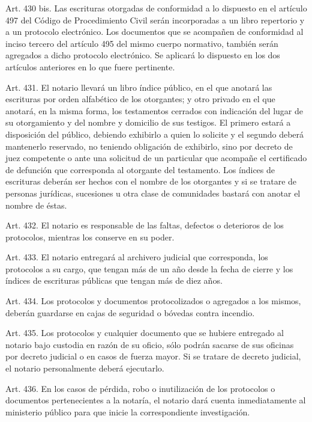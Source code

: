     Art. 430 bis. Las escrituras otorgadas de conformidad a lo dispuesto en el artículo 497 del Código de Procedimiento Civil serán incorporadas a un libro repertorio y a un protocolo electrónico. Los documentos que se acompañen de conformidad al inciso tercero del artículo 495 del mismo cuerpo normativo, también serán agregados a dicho protocolo electrónico. Se aplicará lo dispuesto en los dos artículos anteriores en lo que fuere pertinente.

    Art. 431. El notario llevará un libro índice público, en el que anotará las escrituras por orden alfabético de los otorgantes; y otro privado en el que anotará, en la misma forma, los testamentos cerrados con indicación del lugar de su otorgamiento y del nombre y domicilio de sus testigos.
    El primero estará a disposición del público, debiendo exhibirlo a quien lo solicite y el segundo deberá mantenerlo reservado, no teniendo obligación de exhibirlo, sino por decreto de juez competente o ante una solicitud de un particular que acompañe el certificado de defunción que corresponda al otorgante del testamento.
    Los índices de escrituras deberán ser hechos con el nombre de los otorgantes y si se tratare de personas jurídicas, sucesiones u otra clase de comunidades bastará con anotar el nombre de éstas.



    Art. 432. El notario es responsable de las faltas, defectos o deterioros de los protocolos, mientras los conserve en su poder.



    Art. 433. El notario entregará al archivero judicial que corresponda, los protocolos a su cargo, que tengan más de un año desde la fecha de cierre y los índices de escrituras públicas que tengan más de diez años.



    Art. 434. Los protocolos y documentos protocolizados o agregados a los mismos, deberán guardarse en cajas de seguridad o bóvedas contra incendio.


    Art. 435. Los protocolos y cualquier documento que se hubiere entregado al notario bajo custodia en razón de su oficio, sólo podrán sacarse de sus oficinas por decreto judicial o en casos de fuerza mayor.
    Si se tratare de decreto judicial, el notario personalmente deberá ejecutarlo.



    Art. 436. En los casos de pérdida, robo o inutilización de los protocolos o documentos pertenecientes a la notaría, el notario dará cuenta inmediatamente al ministerio público para que inicie la correspondiente investigación.



